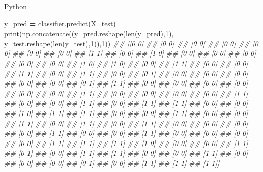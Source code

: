 \documentclass[
]{book}
\newenvironment{Shaded}{\begin{snugshade}}{\end{snugshade}}
\newcommand{\BuiltInTok}[1]{#1}
\newcommand{\CommentTok}[1]{\textcolor[rgb]{0.56,0.35,0.01}{\textit{#1}}}
\newcommand{\DecValTok}[1]{\textcolor[rgb]{0.00,0.00,0.81}{#1}}
\newcommand{\NormalTok}[1]{#1}
\newcommand{\OperatorTok}[1]{\textcolor[rgb]{0.81,0.36,0.00}{\textbf{#1}}}
\theoremstyle{definition}
\theoremstyle{definition}
\theoremstyle{definition}
\theoremstyle{definition}
\theoremstyle{remark}
\begin{document}
Python

\begin{Shaded}
\begin{Highlighting}[]
\NormalTok{y\_pred }\OperatorTok{=}\NormalTok{ classifier.predict(X\_test)}
\BuiltInTok{print}\NormalTok{(np.concatenate((y\_pred.reshape(}\BuiltInTok{len}\NormalTok{(y\_pred),}\DecValTok{1}\NormalTok{), y\_test.reshape(}\BuiltInTok{len}\NormalTok{(y\_test),}\DecValTok{1}\NormalTok{)),}\DecValTok{1}\NormalTok{))}
\CommentTok{\#\# [[0 0]}
\CommentTok{\#\#  [0 0]}
\CommentTok{\#\#  [0 0]}
\CommentTok{\#\#  [0 0]}
\CommentTok{\#\#  [0 0]}
\CommentTok{\#\#  [0 0]}
\CommentTok{\#\#  [0 0]}
\CommentTok{\#\#  [1 1]}
\CommentTok{\#\#  [0 0]}
\CommentTok{\#\#  [1 0]}
\CommentTok{\#\#  [0 0]}
\CommentTok{\#\#  [0 0]}
\CommentTok{\#\#  [0 0]}
\CommentTok{\#\#  [0 0]}
\CommentTok{\#\#  [0 0]}
\CommentTok{\#\#  [1 0]}
\CommentTok{\#\#  [1 0]}
\CommentTok{\#\#  [0 0]}
\CommentTok{\#\#  [1 1]}
\CommentTok{\#\#  [0 0]}
\CommentTok{\#\#  [0 0]}
\CommentTok{\#\#  [1 1]}
\CommentTok{\#\#  [0 0]}
\CommentTok{\#\#  [1 1]}
\CommentTok{\#\#  [0 0]}
\CommentTok{\#\#  [0 1]}
\CommentTok{\#\#  [0 0]}
\CommentTok{\#\#  [0 0]}
\CommentTok{\#\#  [0 0]}
\CommentTok{\#\#  [0 0]}
\CommentTok{\#\#  [0 0]}
\CommentTok{\#\#  [0 1]}
\CommentTok{\#\#  [1 1]}
\CommentTok{\#\#  [0 0]}
\CommentTok{\#\#  [0 0]}
\CommentTok{\#\#  [0 0]}
\CommentTok{\#\#  [0 0]}
\CommentTok{\#\#  [0 0]}
\CommentTok{\#\#  [0 0]}
\CommentTok{\#\#  [1 1]}
\CommentTok{\#\#  [0 0]}
\CommentTok{\#\#  [0 0]}
\CommentTok{\#\#  [0 0]}
\CommentTok{\#\#  [0 0]}
\CommentTok{\#\#  [1 1]}
\CommentTok{\#\#  [0 0]}
\CommentTok{\#\#  [0 0]}
\CommentTok{\#\#  [1 1]}
\CommentTok{\#\#  [0 0]}
\CommentTok{\#\#  [1 1]}
\CommentTok{\#\#  [1 1]}
\CommentTok{\#\#  [0 0]}
\CommentTok{\#\#  [0 0]}
\CommentTok{\#\#  [1 0]}
\CommentTok{\#\#  [1 1]}
\CommentTok{\#\#  [1 1]}
\CommentTok{\#\#  [0 0]}
\CommentTok{\#\#  [0 0]}
\CommentTok{\#\#  [1 1]}
\CommentTok{\#\#  [0 0]}
\CommentTok{\#\#  [0 0]}
\CommentTok{\#\#  [1 1]}
\CommentTok{\#\#  [0 0]}
\CommentTok{\#\#  [1 1]}
\CommentTok{\#\#  [0 0]}
\CommentTok{\#\#  [1 1]}
\CommentTok{\#\#  [0 0]}
\CommentTok{\#\#  [0 0]}
\CommentTok{\#\#  [0 0]}
\CommentTok{\#\#  [0 0]}
\CommentTok{\#\#  [1 1]}
\CommentTok{\#\#  [0 0]}
\CommentTok{\#\#  [0 0]}
\CommentTok{\#\#  [1 1]}
\CommentTok{\#\#  [0 0]}
\CommentTok{\#\#  [0 0]}
\CommentTok{\#\#  [0 0]}
\CommentTok{\#\#  [0 0]}
\CommentTok{\#\#  [1 1]}
\CommentTok{\#\#  [1 1]}
\CommentTok{\#\#  [1 1]}
\CommentTok{\#\#  [1 0]}
\CommentTok{\#\#  [0 0]}
\CommentTok{\#\#  [0 0]}
\CommentTok{\#\#  [1 1]}
\CommentTok{\#\#  [0 1]}
\CommentTok{\#\#  [0 0]}
\CommentTok{\#\#  [1 1]}
\CommentTok{\#\#  [1 1]}
\CommentTok{\#\#  [0 0]}
\CommentTok{\#\#  [0 0]}
\CommentTok{\#\#  [1 1]}
\CommentTok{\#\#  [0 0]}
\CommentTok{\#\#  [0 0]}
\CommentTok{\#\#  [0 0]}
\CommentTok{\#\#  [0 1]}
\CommentTok{\#\#  [0 0]}
\CommentTok{\#\#  [1 1]}
\CommentTok{\#\#  [1 1]}
\CommentTok{\#\#  [1 1]]}
\end{Highlighting}
\end{Shaded}
\end{document}
